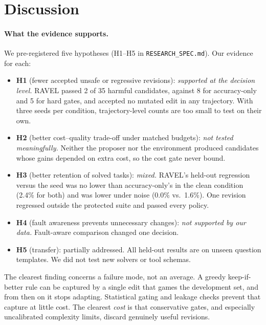 \section{Discussion}
\label{sec:discussion}

\paragraph{What the evidence supports.}
We pre-registered five hypotheses (H1--H5 in \texttt{RESEARCH\_SPEC.md}). Our evidence for each:
\begin{itemize}[leftmargin=*,itemsep=1pt]
\item \textbf{H1} (fewer accepted unsafe or regressive revisions): \emph{supported at the decision level.}
RAVEL passed 2 of 35 harmful candidates, against 8 for accuracy-only and 5 for hard gates, and accepted no
mutated edit in any trajectory. With three seeds per condition, trajectory-level counts are too small
to test on their own.
\item \textbf{H2} (better cost--quality trade-off under matched budgets): \emph{not tested meaningfully.}
Neither the proposer nor the environment produced candidates whose gains depended on extra cost, so the
cost gate never bound.
\item \textbf{H3} (better retention of solved tasks): \emph{mixed.} RAVEL's held-out regression versus
the seed was no lower than accuracy-only's in the clean condition (2.4\% for both) and was lower under
noise (0.0\% vs.\ 1.6\%). One revision regressed outside the protected suite and passed every
policy.
\item \textbf{H4} (fault awareness prevents unnecessary changes): \emph{not supported by our data.}
Fault-aware comparison changed one decision.
\item \textbf{H5} (transfer): partially addressed. All held-out results are on unseen question templates.
We did not test new solvers or tool schemas.
\end{itemize}
The clearest finding concerns a failure mode, not an average. A greedy keep-if-better rule can be
captured by a single edit that games the development set, and from then on it stops adapting. Statistical
gating and leakage checks prevent that capture at little cost. The clearest \emph{cost} is that
conservative gates, and especially uncalibrated complexity limits, discard genuinely useful revisions.

